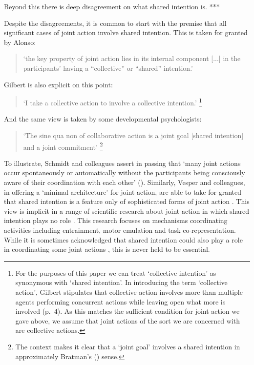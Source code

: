 \documentclass[12pt,a4paper]{extarticle}
\begin{document}
Beyond this there is deep disagreement on what shared intention is.
***


Despite the disagreements, it is common to start with the premise that all significant cases of joint action involve shared intention.  
This is taken for granted by Alonso:
%
\begin{quote}
`the key property of joint action lies in its internal component [...] in the participants’ having a “collective” or “shared” intention.' \citep[pp. 444-5]{alonso_shared_2009}
\end{quote}
%
Gilbert is also explicit on this point:  
%
\begin{quote} 
`I take a collective action to involve a collective intention.'  \citep[p.\ 5]{Gilbert:2006wr}\footnote{
For the purposes of this paper we can treat `collective intention' as synonymous with `shared intention'.  
In introducing the term `collective action', Gilbert stipulates that collective action involves more than multiple agents performing concurrent actions while leaving open what more is involved (p.\ 4).   
As this matches the sufficient condition for joint action we gave above, we assume that joint actions of the sort we are concerned with are collective actions.
}
\end{quote}
%
And the same view is taken by some developmental psychologists:
%
\begin{quote}
`The sine qua non of collaborative action is a joint goal [shared intention] and a joint commitment’ 
\citep[p.\ 181]{tomasello:2008origins}\footnote{
The context makes it clear that a `joint goal' involves a shared intention in approximately Bratman's (\citeyear{Bratman:1993je}) sense.
}
\end{quote}
%


To illustrate, Schmidt and colleagues assert in passing that `many joint actions occur spontaneously or automatically without the participants being consciously aware of their coordination with each other' (\citeyear[p. 7]{schmidt_understanding_2010}).
Similarly, Vesper and colleagues, in offering a `minimal architecture' for joint action, are able to take for granted that shared intention is a feature only of sophisticated forms of joint action \citep{vesper_minimal_2010}.
This view is implicit in a range of scientific research about joint action in which shared intention plays no role 
	\citep[as reviewed in][]{%
		Knoblich:2010fk,
		Sebanz:2006yq%
	}.
This research focuses on mechanisms coordinating activities including entrainment, motor emulation and task co-representation.  
While it is sometimes acknowledged that shared intention could also play a role in coordinating some joint actions \citep[e.g.][]{Knoblich:2008hy}, this is never held to be essential.
\end{document}
